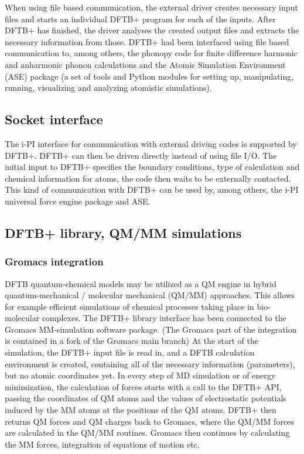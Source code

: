 \documentclass[reprint,onecolumn,superscriptaddress]{revtex4-1}
\newcommand{\dftbp}{DFTB+}
\begin{document}
When using file based communication, the external driver creates necessary input
files and starts an individual \dftbp{} program for each of the
inputs. After \dftbp{} has finished, the driver analyses the created output
files and extracts the necessary information from those. \dftbp{} had been
interfaced using file based communication to, among others, the
phonopy\cite{phonopy} code for finite difference harmonic and anharmonic phonon
calculations and the Atomic Simulation Environment (ASE)
package\cite{larsen-jpcm-2017} (a set of tools and Python modules for setting
up, manipulating, running, visualizing and analyzing atomistic simulations).

\subsection{Socket interface}

The i-PI\cite{ipi} interface for communication with external driving codes is
supported by \dftbp{}. \dftbp{} can then be driven directly instead of
using file I/O. The initial input to \dftbp{} specifies the boundary conditions,
type of calculation and chemical information for atoms, the code then waits to
be externally contacted. This kind of communication with \dftbp{} can be used
by, among others, the i-PI universal force engine package\cite{ipi} and
ASE.\cite{larsen-jpcm-2017}


\subsection{\dftbp{} library, QM/MM simulations}

\subsubsection{Gromacs integration}

DFTB quantum-chemical models may be utilized as a QM engine in hybrid
quantum-mechanical / molecular mechanical (QM/MM) approaches.  This allows for
example efficient simulations of chemical processes taking place in bio-molecular
complexes.  The \dftbp{} library interface has been connected to the
Gromacs\cite{Gromacs7} MM-simulation software package. (The Gromacs part of the
integration is contained in a fork of the Gromacs main
branch\cite{gromacs-dftbplus-repo}) At the start of the simulation, the \dftbp{}
input file is read in, and a DFTB calculation environment is created, containing
all of the necessary information (parameters), but no atomic coordinates yet.
In every step of MD simulation or of energy minimization, the calculation of
forces starts with a call to the \dftbp{} API, passing the coordinates of QM
atoms and the values of electrostatic potentials induced by the MM atoms at the
positions of the QM atoms.  \dftbp{} then returns QM forces and QM charges back
to Gromacs, where the QM/MM forces are calculated in the QM/MM routines.
Gromacs then continues by calculating the MM forces, integration of equations of
motion etc.
\end{document}
